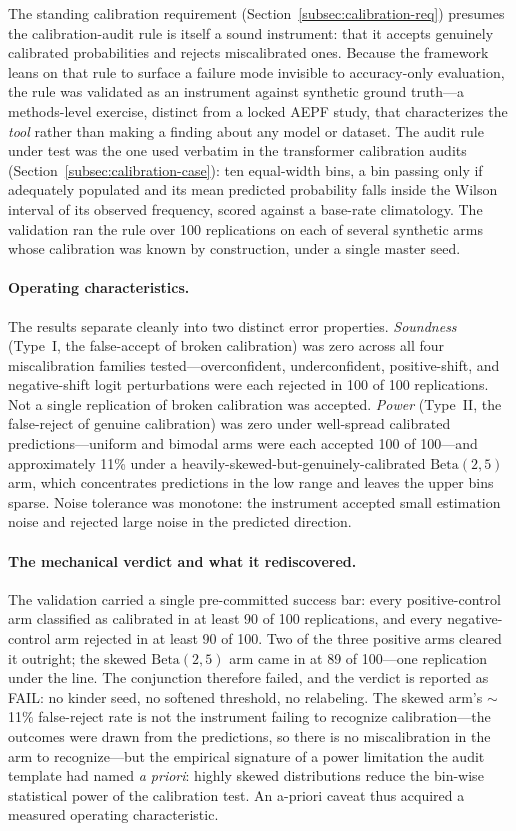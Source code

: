 \documentclass[11pt]{article}
\begin{document}
The standing calibration requirement
(Section~\ref{subsec:calibration-req}) presumes the calibration-audit
rule is itself a sound instrument: that it accepts genuinely
calibrated probabilities and rejects miscalibrated ones. Because the
framework leans on that rule to surface a failure mode invisible to
accuracy-only evaluation, the rule was validated as an instrument
against synthetic ground truth---a methods-level exercise, distinct
from a locked AEPF study, that characterizes the \emph{tool} rather
than making a finding about any model or dataset. The audit rule
under test was the one used verbatim in the transformer calibration
audits (Section~\ref{subsec:calibration-case}): ten equal-width bins,
a bin passing only if adequately populated and its mean predicted
probability falls inside the Wilson interval of its observed
frequency, scored against a base-rate climatology. The validation ran
the rule over 100 replications on each of several synthetic arms whose
calibration was known by construction, under a single master seed.

\paragraph{Operating characteristics.}
The results separate cleanly into two distinct error properties.
\emph{Soundness} (Type~I, the false-accept of broken calibration) was
zero across all four miscalibration families tested---overconfident,
underconfident, positive-shift, and negative-shift logit
perturbations were each rejected in 100 of 100 replications. Not a
single replication of broken calibration was accepted. \emph{Power}
(Type~II, the false-reject of genuine calibration) was zero under
well-spread calibrated predictions---uniform and bimodal arms were
each accepted 100 of 100---and approximately 11\% under a
heavily-skewed-but-genuinely-calibrated $\mathrm{Beta}(2,5)$ arm,
which concentrates predictions in the low range and leaves the upper
bins sparse. Noise tolerance was monotone: the instrument accepted
small estimation noise and rejected large noise in the predicted
direction.

\paragraph{The mechanical verdict and what it rediscovered.}
The validation carried a single pre-committed success bar: every
positive-control arm classified as calibrated in at least 90 of 100
replications, and every negative-control arm rejected in at least 90
of 100. Two of the three positive arms cleared it outright; the
skewed $\mathrm{Beta}(2,5)$ arm came in at 89 of 100---one replication
under the line. The conjunction therefore failed, and the verdict is
reported as FAIL: no kinder seed, no softened threshold, no
relabeling. The skewed arm's $\sim$11\% false-reject rate is not the
instrument failing to recognize calibration---the outcomes were drawn
from the predictions, so there is no miscalibration in the arm to
recognize---but the empirical signature of a power limitation the
audit template had named \emph{a priori}: highly skewed distributions
reduce the bin-wise statistical power of the calibration test. An
a-priori caveat thus acquired a measured operating characteristic.
\end{document}
